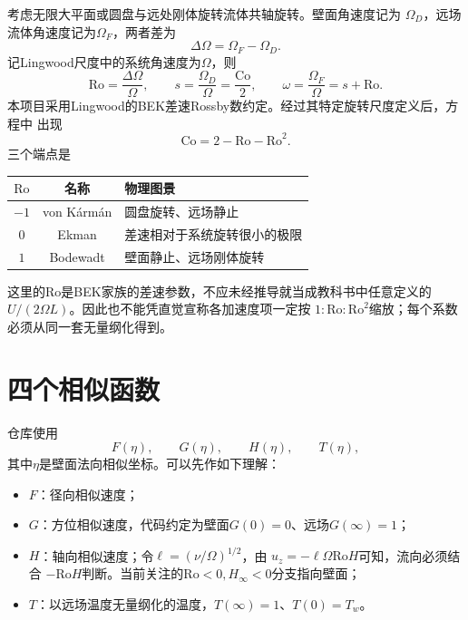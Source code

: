 \documentclass[UTF8,zihao=-4,openany]{ctexbook}
\newcommand{\Ro}{\mathrm{Ro}}
\newcommand{\Co}{\mathrm{Co}}
\begin{document}
考虑无限大平面或圆盘与远处刚体旋转流体共轴旋转。壁面角速度记为
$\Omega_D$，远场流体角速度记为$\Omega_F$，两者差为
\begin{equation}
  \Delta\Omega=\Omega_F-\Omega_D.
\end{equation}
记Lingwood尺度中的系统角速度为$\Omega$，则
\begin{equation}
 \Ro=\frac{\Delta\Omega}{\Omega},\qquad
 s=\frac{\Omega_D}{\Omega}=\frac{\Co}{2},\qquad
 \omega=\frac{\Omega_F}{\Omega}=s+\Ro.
\end{equation}
本项目采用Lingwood的BEK差速Rossby数约定。经过其特定旋转尺度定义后，方程中
出现
\begin{equation}
  \Co=2-\Ro-\Ro^2.
\end{equation}
三个端点是
\begin{center}
\begin{tabular}{ccl}
\toprule
$\Ro$ & 名称 & 物理图景\\
\midrule
$-1$ & von K\'arm\'an & 圆盘旋转、远场静止\\
$0$  & Ekman & 差速相对于系统旋转很小的极限\\
$1$  & Bodewadt & 壁面静止、远场刚体旋转\\
\bottomrule
\end{tabular}
\end{center}

\begin{warningbox}
这里的$\Ro$是BEK家族的差速参数，不应未经推导就当成教科书中任意定义的
$U/(2\Omega L)$。因此也不能凭直觉宣称各加速度项一定按
$1:\Ro:\Ro^2$缩放；每个系数必须从同一套无量纲化得到。
\end{warningbox}

\section{四个相似函数}

仓库使用
\begin{equation}
  F(\eta),\qquad G(\eta),\qquad H(\eta),\qquad T(\eta),
\end{equation}
其中$\eta$是壁面法向相似坐标。可以先作如下理解：

\begin{itemize}
  \item $F$：径向相似速度；
  \item $G$：方位相似速度，代码约定为壁面$G(0)=0$、远场$G(\infty)=1$；
  \item $H$：轴向相似速度；令$\ell=(\nu/\Omega)^{1/2}$，由
  $u_z=-\ell\Omega\Ro H$可知，流向必须结合
  $-\Ro H$判断。当前关注的$\Ro<0,H_\infty<0$分支指向壁面；
  \item $T$：以远场温度无量纲化的温度，$T(\infty)=1$、$T(0)=T_w$。
\end{itemize}
\end{document}
